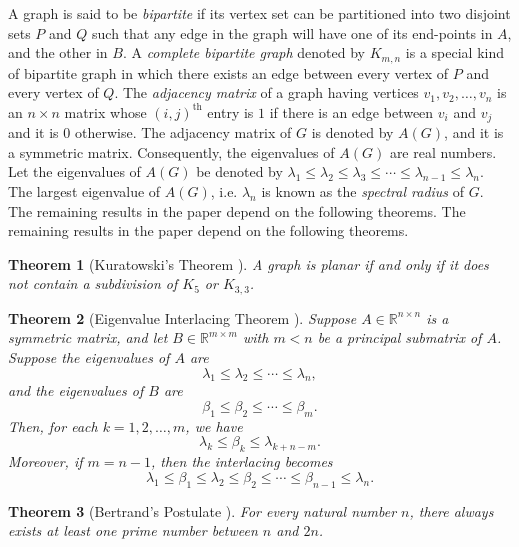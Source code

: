 \documentclass[12pt]{article}
\newtheorem{theorem}{Theorem}[section]
\begin{document}
	A graph is said to be \textit{bipartite} if its vertex set can be partitioned into two disjoint sets $P$ and $Q$ such that any edge in the graph will have one of its end-points in $A$, and the other in $B$.
	A \textit{complete bipartite graph} denoted by $K_{m,n}$ is a special kind of bipartite graph in which there exists an edge between every vertex of $P$ and every vertex of $Q$.
	The \textit{adjacency matrix} of a graph having vertices $v_1, v_2, \dots, v_n$ is an $n\times n$ matrix whose $(i,j)^{\text{th}}$ entry is $1$ if there is an edge between $v_i$ and $v_j$ and it is $0$ otherwise.
	The adjacency matrix of $G$ is denoted by $A(G)$, and it is a symmetric matrix. Consequently, the eigenvalues of $A(G)$ are real numbers. Let the eigenvalues of $A(G)$ be denoted by $\lambda_1\le \lambda_2\le \lambda_3\le \cdots\le \lambda_{n-1}\le \lambda_n$.
	The largest eigenvalue of $A(G)$, i.e. $\lambda_n$ is known as the \textit{spectral radius} of $G$.
	The remaining results in the paper depend on the following theorems.
	The remaining results in the paper depend on the following theorems.
	
	\begin{theorem}[Kuratowski's Theorem {\cite[Theorem~6.2.2]{west2001introduction}}] \label{Kura}
		A graph is planar if and only if it does not contain a subdivision of \( K_5 \) or \( K_{3,3} \).
	\end{theorem}
	
	\begin{theorem}[Eigenvalue Interlacing Theorem {\cite{brouwer2011spectra}}] \label{ELT}
		Suppose \( A \in \mathbb{R}^{n \times n} \) is a symmetric matrix, and let \( B \in \mathbb{R}^{m \times m} \) with \( m < n \) be a principal submatrix of \( A \). Suppose the eigenvalues of \( A \) are 
		\[
		\lambda_1 \le \lambda_2 \le \cdots \le \lambda_n,
		\]
		and the eigenvalues of \( B \) are
		\[
		\beta_1 \le \beta_2 \le \cdots \le \beta_m.
		\]
		Then, for each \( k = 1, 2, \ldots, m \), we have
		\[
		\lambda_k \le \beta_k \le \lambda_{k + n - m}.
		\]
		Moreover, if \( m = n - 1 \), then the interlacing becomes
		\[
		\lambda_1 \le \beta_1 \le \lambda_2 \le \beta_2 \le \cdots \le \beta_{n-1} \le \lambda_n.
		\]
	\end{theorem}
	
	
	\begin{theorem}[Bertrand's Postulate {\cite{ireland2013classical}}] \label{BT}
		For every natural number \( n \), there always exists at least one prime number between \( n \) and \( 2n \).
	\end{theorem}
	
\end{document}
